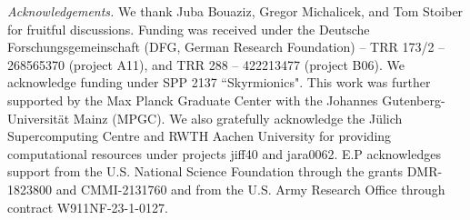 \documentclass[submission, Phys]{SciPost}
\begin{document}
{\itshape Acknowledgements. } We thank Juba Bouaziz, Gregor Michalicek, and Tom Stoiber for fruitful discussions. Funding was received under the Deutsche Forschungsgemeinschaft (DFG, German Research Foundation) -- TRR
173/2 -- 268565370 (project A11), and TRR 288 -- 422213477
(project B06).
We acknowledge funding under SPP 2137 ``Skyrmionics". This work was further supported by the Max Planck Graduate Center with the Johannes Gutenberg-Universit\"at Mainz (MPGC). We also gratefully acknowledge the
J\"ulich Supercomputing Centre and RWTH Aachen University
for providing computational resources under projects jiff40
and jara0062.
E.P acknowledges support from the U.S. National Science Foundation through the grants DMR-1823800 and CMMI-2131760 and from the U.S. Army Research Office through contract W911NF-23-1-0127.



\nolinenumbers
\end{document}
